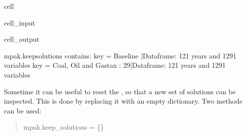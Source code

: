 \documentclass[letterpaper,10pt,english]{jupyterBook}
\begin{document}
\begin{sphinxuseclass}{cell}\begin{sphinxVerbatimInput}

\begin{sphinxuseclass}{cell_input}
\begin{sphinxVerbatim}[commandchars=\\\{\}]
    
    \PYG{p}{[}\PYG{p}{]}\PYG{p}{[}\PYG{p}{]}
\end{sphinxVerbatim}

\end{sphinxuseclass}\end{sphinxVerbatimInput}
\begin{sphinxVerbatimOutput}

\begin{sphinxuseclass}{cell_output}
\begin{sphinxVerbatim}[commandchars=\\\{\}]
mpak.keep\PYGZus{}solutions contains:
key = Baseline                 |Dataframe: 121 years and 1291 variables
key = Coal, Oil and Gastax : 29|Dataframe: 121 years and 1291 variables
\end{sphinxVerbatim}

\end{sphinxuseclass}\end{sphinxVerbatimOutput}

\end{sphinxuseclass}
\sphinxAtStartPar
Sometime it can be useful to reset the , so that a new set of solutions can be inspected. This is done by replacing it with an empty dictionary. Two methods can be used:
\begin{quote}

\sphinxAtStartPar
mpak.keep\_solutions = \{\}
\end{quote}
\end{document}
